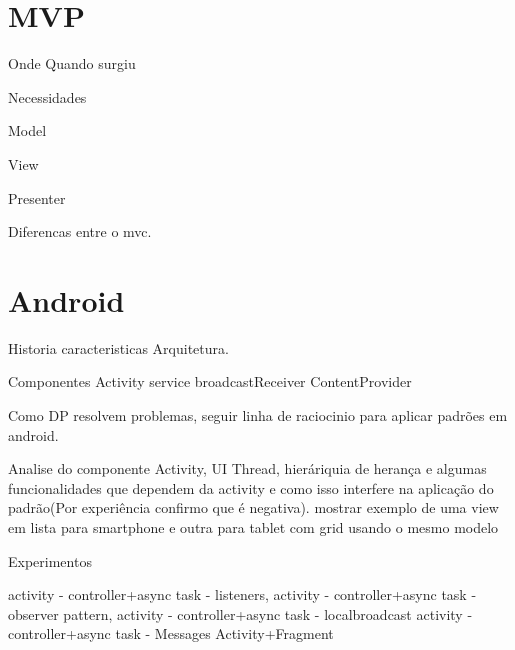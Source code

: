 \section*{MVP}

Onde Quando surgiu

Necessidades 

Model

View 

Presenter

Diferencas entre o mvc.

\section*{Android}
 
Historia caracteristicas
Arquitetura.

Componentes
	Activity
	service
	broadcastReceiver
	ContentProvider



Como DP resolvem problemas, seguir linha de raciocinio para aplicar padrões em
android.


Analise do componente Activity, UI Thread, hieráriquia de herança e algumas
funcionalidades que dependem da activity e como isso interfere na aplicação do
padrão(Por experiência confirmo que é negativa). mostrar exemplo de uma view em
lista para smartphone e outra para tablet com grid usando o mesmo modelo

Experimentos

activity - controller+async task - listeners,
activity - controller+async task - observer pattern,
activity - controller+async task - localbroadcast
activity - controller+async task - Messages
Activity+Fragment


